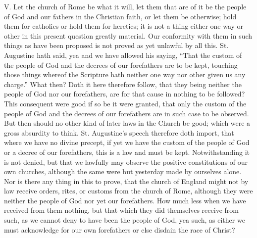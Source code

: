 V. Let the church of Rome be what it will, let them that are of it be the people of God and our fathers in the Christian faith, or let them be otherwise; hold them for catholics or hold them for heretics; it is not a thing either one way or other in this present question greatly material. Our conformity with them in such things as have been proposed is not proved as yet unlawful by all this. St. Augustine hath said, yea and we have allowed his saying, “That the custom of the people of God and the decrees of our forefathers are  to be kept, touching those things whereof the Scripture hath neither one way nor other given us any charge.” What then? Doth it here therefore follow, that they being neither the people of God nor our forefathers, are for that cause in nothing to be followed? This consequent were good if so be it were granted, that only the custom of the people of God and the decrees of our forefathers are in such case to be observed. But then should no other kind of later laws in the Church be good; which were a gross absurdity to think. St. Augustine’s speech therefore doth import, that where we have no divine precept, if yet we have the custom of the people of God or a decree of our forefathers, this is a law and must be kept. Notwithstanding it is not denied, but that we lawfully may observe the positive constitutions of our own churches, although the same were but yesterday made by ourselves alone. Nor is there any thing in this to prove, that the church of England might not by law receive orders, rites, or customs from the church of Rome, although they were neither the people of God nor yet our forefathers. How much less when we have received from them nothing, but that which they did themselves receive from such, as we cannot deny to have been the people of God, yea such, as either we must acknowledge for our own forefathers or else disdain the race of Christ?

